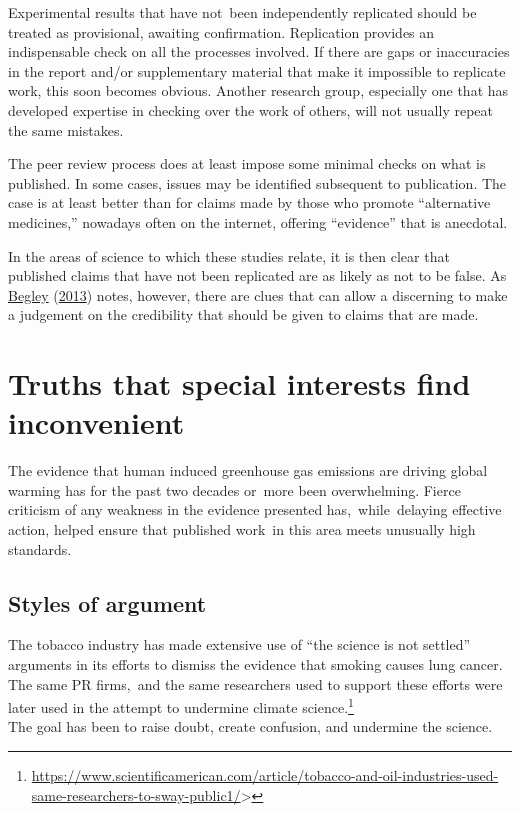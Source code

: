 \documentclass[
  10pt,
  b5paper]{book}
\begin{document}
Experimental results that have not~been independently
replicated should be treated as provisional, awaiting
confirmation. Replication provides an indispensable
check on all the processes involved. If there are gaps
or inaccuracies in the report and/or supplementary
material that make it impossible to replicate work,
this soon becomes obvious. Another research group,
especially one that has developed expertise in
checking over the work of others, will not usually
repeat the same mistakes.

The peer review process does at least impose some minimal
checks on what is published. In some cases, issues
may be identified subsequent to publication. The case is
at least better than for claims made by those who promote
``alternative medicines,'' nowadays often on the internet,
offering ``evidence'' that is anecdotal.

In the areas of science to which these studies relate,
it is then clear that published claims that have not
been replicated are as likely as not to be false. As
\protect\hyperlink{ref-r2_begley_2013}{Begley} (\protect\hyperlink{ref-r2_begley_2013}{2013}) notes, however, there are clues that
can allow a discerning to make a judgement on the
credibility that should be given to claims that are
made.

\hypertarget{truths-that-special-interests-find-inconvenient}{%
\section{Truths that special interests find inconvenient}\label{truths-that-special-interests-find-inconvenient}}

The evidence that human induced greenhouse gas emissions
are driving global warming has for the past two decades
or~more been overwhelming. Fierce criticism of any weakness
in the evidence presented has,~while~delaying effective
action, helped ensure that published work~in this area meets
unusually high standards.

\hypertarget{styles-of-argument}{%
\subsection*{Styles of argument}\label{styles-of-argument}}

The tobacco industry has made extensive use of ``the science is not settled''
arguments in its efforts to dismiss the evidence that smoking causes lung cancer.
The same PR firms,~and the same researchers used to support these efforts
were later used in the attempt to undermine climate science.\footnote{\url{https://www.scientificamerican.com/article/tobacco-and-oil-industries-used-same-researchers-to-sway-public1/}\textgreater{}}\\
The goal has been to raise doubt, create confusion, and undermine the
science.
\end{document}
